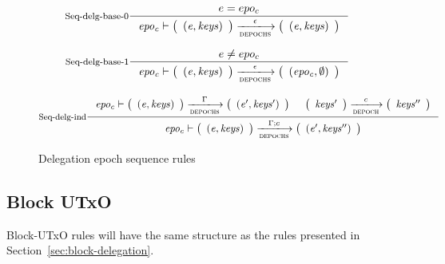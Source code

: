 \begin{figure}
  \begin{equation}
    \inference[Seq-delg-base-0]
    {e = epo_c}
    { \var{epo_c} \vdash \left(
        \begin{array}{r}
          \var{(e, keys)}
        \end{array}
      \right)
        \trans{depochs}{\epsilon}
      \left(
        \begin{array}{r}
          \var{(e, keys)}
        \end{array}
      \right)
    }
    \label{eq:rule:depoch-sequence-base-0}
  \end{equation}

  \begin{equation}
    \inference[Seq-delg-base-1]
    {e \neq epo_c}
    { \var{epo_c} \vdash \left(
        \begin{array}{r}
          \var{(e, keys)}
        \end{array}
      \right)
        \trans{depochs}{\epsilon}
      \left(
        \begin{array}{r}
          \var{(\var{epo_c}, \emptyset)}
        \end{array}
      \right)
    }
    \label{eq:rule:depoch-sequence-base-1}
  \end{equation}
  
  \begin{equation}
    \inference[Seq-delg-ind]
    { \var{epo_c} \vdash
      {\left(
        \begin{array}{r}
          \var{(e, keys)}
        \end{array}
      \right)}
      \trans{depochs}{\Gamma}
      {\left(
        \begin{array}{r}
          \var{(e', keys')}
        \end{array}
      \right)}
    &
    {\left(
        \begin{array}{r}
          \var{keys'}
        \end{array}
      \right)}
      \trans{depoch}{c}
      {\left(
        \begin{array}{r}
          \var{keys''}
        \end{array}
      \right)}
    }
    { \var{epo_c} \vdash \left(
        \begin{array}{r}
          \var{(e, keys)}
        \end{array}
      \right)
      \trans{depochs}{\Gamma; c}
      \left(
        \begin{array}{r}
          \var{(e', keys'')}
        \end{array}
      \right)
    }
    \label{eq:rule:depoch-sequence-inductive}
  \end{equation}
  \caption{Delegation epoch sequence rules}
  \label{fig:rules:epoch-sequence}
\end{figure}

\subsection{Block UTxO}
\label{sec:block-utxo}

\begin{todo}
  Block-UTxO rules will have the same structure as the rules presented in
  Section~\ref{sec:block-delegation}.
\end{todo}
